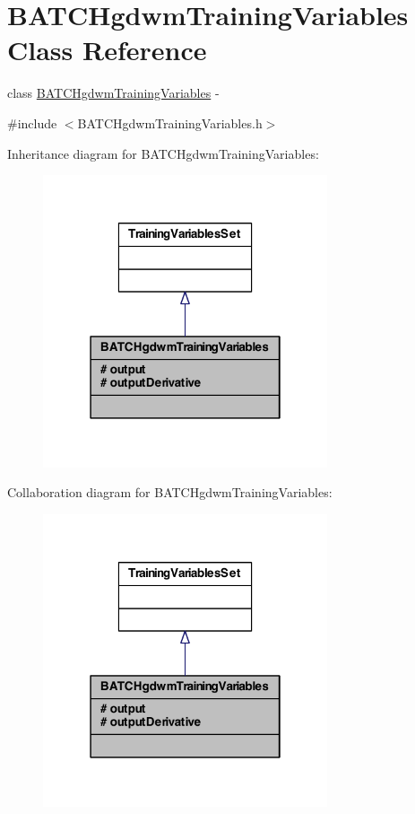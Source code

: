 \hypertarget{class_b_a_t_c_hgdwm_training_variables}{
\section{BATCHgdwmTrainingVariables Class Reference}
\label{class_b_a_t_c_hgdwm_training_variables}
}


class \hyperlink{class_b_a_t_c_hgdwm_training_variables}{BATCHgdwmTrainingVariables} -\/  




{\ttfamily \#include $<$BATCHgdwmTrainingVariables.h$>$}



Inheritance diagram for BATCHgdwmTrainingVariables:\nopagebreak
\begin{figure}[H]
\begin{center}
\leavevmode
\includegraphics[width=238pt]{class_b_a_t_c_hgdwm_training_variables__inherit__graph}
\end{center}
\end{figure}


Collaboration diagram for BATCHgdwmTrainingVariables:\nopagebreak
\begin{figure}[H]
\begin{center}
\leavevmode
\includegraphics[width=238pt]{class_b_a_t_c_hgdwm_training_variables__coll__graph}
\end{center}
\end{figure}
